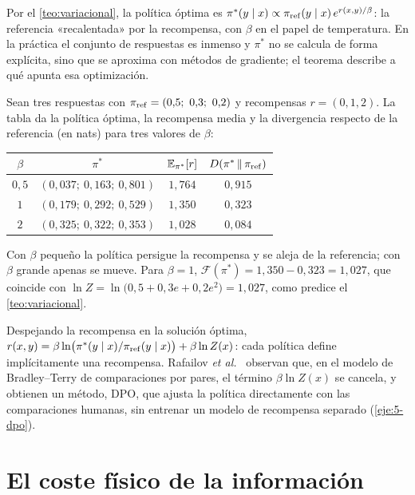 Por el \cref{teo:variacional}, la política óptima es $\pi^{*}(y\mid x)\propto\pi_{\mathrm{ref}}(y\mid x)\,e^{r(x,y)/\beta}$: la referencia «recalentada» por la recompensa, con $\beta$ en el papel de temperatura. En la práctica el conjunto de respuestas es inmenso y $\pi^{*}$ no se calcula de forma explícita, sino que se aproxima con métodos de gradiente; el teorema describe a qué apunta esa optimización.

\begin{ejemplo}\label{ej:rlhf}
Sean tres respuestas con $\pi_{\mathrm{ref}}=(0{,}5;\ 0{,}3;\ 0{,}2)$ y recompensas $r=(0,1,2)$. La tabla da la política óptima, la recompensa media y la divergencia respecto de la referencia (en nats) para tres valores de $\beta$:
\begin{center}
\begin{tabular}{@{}cccc@{}}
\toprule
$\beta$ & $\pi^{*}$ & $\mathbb{E}_{\pi^{*}}[r]$ & $D(\pi^{*}\,\|\,\pi_{\mathrm{ref}})$ \\
\midrule
$0{,}5$ & $(0{,}037;\ 0{,}163;\ 0{,}801)$ & $1{,}764$ & $0{,}915$ \\
$1$ & $(0{,}179;\ 0{,}292;\ 0{,}529)$ & $1{,}350$ & $0{,}323$ \\
$2$ & $(0{,}325;\ 0{,}322;\ 0{,}353)$ & $1{,}028$ & $0{,}084$ \\
\bottomrule
\end{tabular}
\end{center}
Con $\beta$ pequeño la política persigue la recompensa y se aleja de la referencia; con $\beta$ grande apenas se mueve. Para $\beta=1$, $\mathcal{F}(\pi^{*})=1{,}350-0{,}323=1{,}027$, que coincide con $\ln Z=\ln\bigl(0{,}5+0{,}3e+0{,}2e^{2}\bigr)=1{,}027$, como predice el \cref{teo:variacional}.
\end{ejemplo}

\begin{observacion}
Despejando la recompensa en la solución óptima, $r(x,y)=\beta\ln\bigl(\pi^{*}(y\mid x)/\pi_{\mathrm{ref}}(y\mid x)\bigr)+\beta\ln Z(x)$: cada política define implícitamente una recompensa. Rafailov \emph{et al.}~\cite{dpo} observan que, en el modelo de Bradley--Terry de comparaciones por pares, el término $\beta\ln Z(x)$ se cancela, y obtienen un método, DPO, que ajusta la política directamente con las comparaciones humanas, sin entrenar un modelo de recompensa separado (\cref{eje:5-dpo}).
\end{observacion}

\section{El coste físico de la información}

